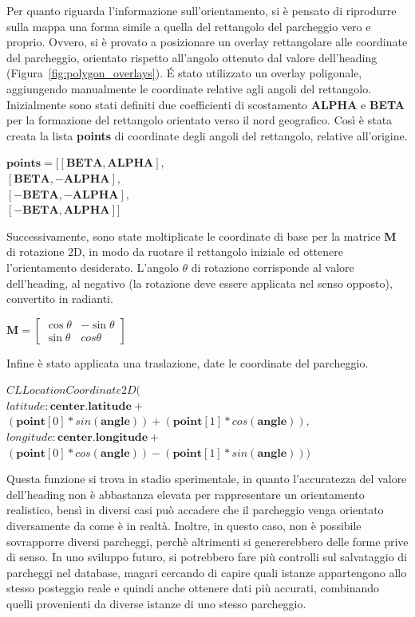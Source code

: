Per quanto riguarda l'informazione sull'orientamento, si è pensato di riprodurre 
sulla mappa una forma simile a quella del rettangolo del parcheggio vero e 
proprio. Ovvero, si è provato a posizionare un overlay rettangolare alle coordinate
del parcheggio, orientato rispetto all'angolo ottenuto dal valore dell'heading
(Figura~\ref{fig:polygon_overlays}). 
\'E stato utilizzato un overlay poligonale, aggiungendo manualmente le coordinate
relative agli angoli del rettangolo. Inizialmente sono stati definiti due coefficienti 
di scostamento \textbf{ALPHA} e \textbf{BETA} per la formazione del rettangolo orientato 
verso il nord geografico. Così è stata creata la lista \textbf{points} di coordinate degli
angoli del rettangolo, relative all'origine. 
\begin{center}
    $ \textbf{points} = [[\textbf{BETA}, \textbf{ALPHA}],$\\
        $[\textbf{BETA}, -\textbf{ALPHA}],$\\
        $[-\textbf{BETA}, -\textbf{ALPHA}],$\\
        $[-\textbf{BETA}, \textbf{ALPHA}]] $
\end{center}
Successivamente, sono state moltiplicate le coordinate di base per la matrice \textbf{M} 
di rotazione 2D, in modo da ruotare il rettangolo iniziale ed ottenere 
l'orientamento desiderato. L'angolo $\theta$ di rotazione corrisponde al valore dell'heading, al negativo (la 
rotazione deve essere applicata nel senso opposto), convertito in radianti. 
\begin{center}
    $\textbf{M} = \begin{bmatrix}
        \cos{\theta} & -\sin{\theta}\\
        \sin{\theta} & cos{\theta}
    \end{bmatrix}$
\end{center}
Infine è stato applicata una traslazione, date le coordinate del parcheggio.
\begin{center}
    $CLLocationCoordinate2D($\\
    $latitude: \textbf{center.latitude} + $ \\
    $(\textbf{point}[0] * sin(\textbf{angle})) + (\textbf{point}[1] * cos(\textbf{angle})),$\\
    $longitude: \textbf{center.longitude} + $ \\
    $(\textbf{point}[0] * cos(\textbf{angle})) - (\textbf{point}[1] * sin(\textbf{angle})))$
\end{center}
Questa funzione si trova in stadio sperimentale, in quanto l'accuratezza del valore
dell'heading non è abbastanza elevata per rappresentare un orientamento realistico, 
bensì in diversi casi può accadere che il parcheggio venga orientato diversamente 
da come è in realtà. Inoltre, in questo caso, non è possibile sovrapporre diversi
parcheggi, perchè altrimenti si genererebbero delle forme prive di senso. In uno 
sviluppo futuro, si potrebbero fare più controlli sul salvataggio di parcheggi nel
database, magari cercando di capire quali istanze appartengono allo stesso posteggio
reale e quindi anche ottenere dati più accurati, combinando quelli provenienti da 
diverse istanze di uno stesso parcheggio.


